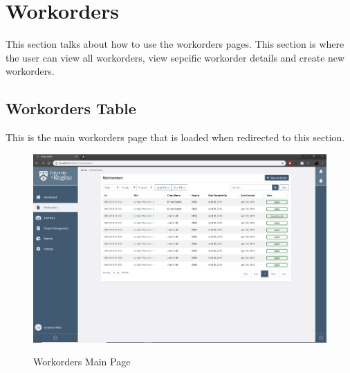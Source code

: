 \section{Workorders}
This section talks about how to use the workorders pages. This section is where the user can view all workorders, view sepcific workorder details and create new workorders. 

\subsection{Workorders Table}
This is the main workorders page that is loaded when redirected to this section. 
\begin{figure}[H]
	\centering
	\includegraphics[width=5in]{workorders.png}\\
	\caption{Workorders Main Page}
	\label{fig:tobias}
\end{figure}

